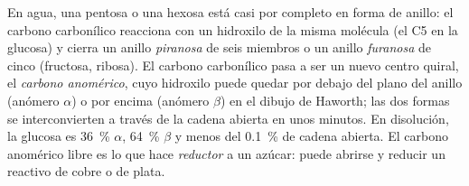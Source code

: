 \begin{proposition}\label{prop:b1:carbohydrates:rings}
En agua, una pentosa o una hexosa está casi por completo en forma de
anillo: el carbono carbonílico reacciona con un hidroxilo de la misma
molécula (el C5 en la glucosa) y cierra un anillo \emph{piranosa} de seis
miembros o un anillo \emph{furanosa} de cinco (fructosa, ribosa). El carbono
carbonílico pasa a ser un nuevo centro quiral, el \emph{carbono anomérico},
cuyo hidroxilo puede quedar por debajo del plano del anillo (anómero
$\alpha$) o por encima (anómero $\beta$) en el dibujo de Haworth; las dos
formas se interconvierten a través de la cadena abierta en unos minutos. En
disolución, la glucosa es \qty{36}{\%} $\alpha$, \qty{64}{\%} $\beta$ y
menos del \qty{0.1}{\%} de cadena abierta. El carbono anomérico libre es lo
que hace \emph{reductor} a un azúcar: puede abrirse y reducir un reactivo de
cobre o de plata.
\end{proposition}

